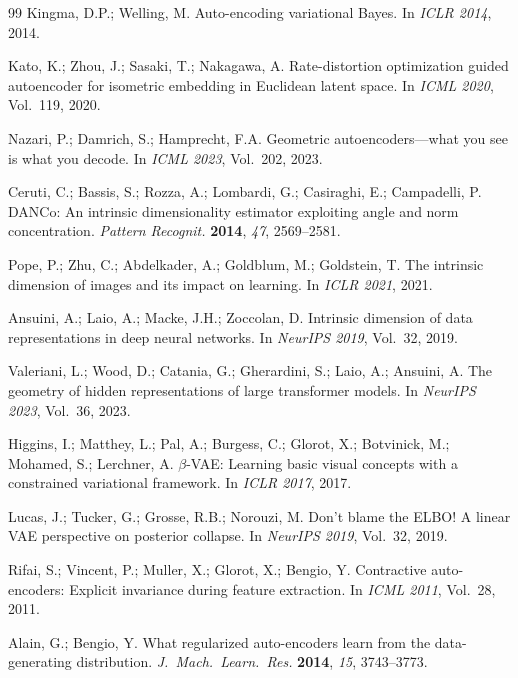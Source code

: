 \documentclass[make,article,submit,pdftex,moreauthors]{Definitions/mdpi}
\begin{document}
\begin{thebibliography}{99}
Kingma, D.P.; Welling, M.
Auto-encoding variational Bayes.
In \textit{ICLR 2014}, 2014.

Kato, K.; Zhou, J.; Sasaki, T.; Nakagawa, A.
Rate-distortion optimization guided autoencoder for isometric embedding in Euclidean latent space.
In \textit{ICML 2020}, Vol.~119, 2020.

Nazari, P.; Damrich, S.; Hamprecht, F.A.
Geometric autoencoders---what you see is what you decode.
In \textit{ICML 2023}, Vol.~202, 2023.

Ceruti, C.; Bassis, S.; Rozza, A.; Lombardi, G.; Casiraghi, E.; Campadelli, P.
DANCo: An intrinsic dimensionality estimator exploiting angle and norm concentration.
\textit{Pattern Recognit.} \textbf{2014}, \textit{47}, 2569--2581.

Pope, P.; Zhu, C.; Abdelkader, A.; Goldblum, M.; Goldstein, T.
The intrinsic dimension of images and its impact on learning.
In \textit{ICLR 2021}, 2021.

Ansuini, A.; Laio, A.; Macke, J.H.; Zoccolan, D.
Intrinsic dimension of data representations in deep neural networks.
In \textit{NeurIPS 2019}, Vol.~32, 2019.

Valeriani, L.; Wood, D.; Catania, G.; Gherardini, S.; Laio, A.; Ansuini, A.
The geometry of hidden representations of large transformer models.
In \textit{NeurIPS 2023}, Vol.~36, 2023.

Higgins, I.; Matthey, L.; Pal, A.; Burgess, C.; Glorot, X.; Botvinick, M.;
Mohamed, S.; Lerchner, A.
$\beta$-VAE: Learning basic visual concepts with a constrained variational framework.
In \textit{ICLR 2017}, 2017.

Lucas, J.; Tucker, G.; Grosse, R.B.; Norouzi, M.
Don't blame the ELBO! A linear VAE perspective on posterior collapse.
In \textit{NeurIPS 2019}, Vol.~32, 2019.

Rifai, S.; Vincent, P.; Muller, X.; Glorot, X.; Bengio, Y.
Contractive auto-encoders: Explicit invariance during feature extraction.
In \textit{ICML 2011}, Vol.~28, 2011.

Alain, G.; Bengio, Y.
What regularized auto-encoders learn from the data-generating distribution.
\textit{J.~Mach.~Learn.~Res.} \textbf{2014}, \textit{15}, 3743--3773.

\end{thebibliography}
\end{document}
